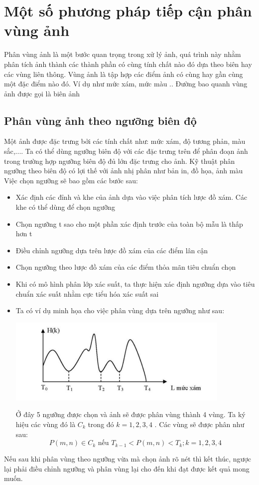 \documentclass[12pt,oneside,a4]{report}
\begin{document}
\chapter{Một số phương pháp tiếp cận phân vùng ảnh}
Phân vùng ảnh là một bước quan trọng trong xử lý ảnh, quá trình này nhằm phân tích ảnh thành các thành phần có cùng tính chất nào đó dựa theo biên hay các vùng liên thông. Vùng ảnh là tập hợp các điểm ảnh có cùng hay gần cùng một đặc điểm nào đó. Ví dụ như mức xám, mức màu .. Đường bao quanh vùng ảnh được gọi là biên ảnh
\section{Phân vùng ảnh theo ngưỡng biên độ}
Một ảnh được đặc trưng bởi các tính chất như: mức xám, độ tương phản, màu sắc,.... Ta có thể dùng ngưỡng biên độ với các đặc trưng trên để phân đoạn ảnh trong trường hợp ngưỡng biên độ đủ lớn đặc trưng cho ảnh. Kỹ thuật phân ngưỡng theo biên độ có lợi thế với ảnh nhị phân như bản in, đồ họa, ảnh màu
Việc chọn ngưỡng sẽ bao gồm các bước sau:
\begin{itemize}
\item Xác định các đỉnh và khe của ảnh dựa vào việc phân tích lược đồ xám. Các khe có thể dùng để chọn ngưỡng
\item Chọn ngưỡng t sao cho một phần xác định trước của toàn bộ mẫu là thấp hơn t
\item Điều chỉnh ngưỡng dựa trên lược đồ xám của các điểm lân cận
\item Chọn ngưỡng theo lược đồ xám của các điểm thỏa mãn tiêu chuẩn chọn
\item Khi có mô hình phân lớp xác suất, ta thực hiện xác định ngưỡng dựa vào tiêu chuẩn xác suất nhằm cực tiểu hóa xác suất sai
\item Ta có ví dụ minh họa cho việc phân vùng dựa trên ngưỡng như sau:
\begin{center}
\includegraphics[]{figure/nguongbiendo.png}
\end{center}
Ở đây 5 ngưỡng được chọn và ảnh sẽ được phân vùng thành 4 vùng. Ta ký hiệu các vùng đó là $C_k$ trong đó $k=1,2,3,4$   . Các vùng sẽ được phân như sau:
\begin{equation}
P(m,n) \in C_{k}\textrm{ nếu } T_{k-1}<P(m,n)<T_{k}; k=1,2,3,4
\end{equation} 
\end{itemize}
Nếu sau khi phân vùng theo ngưỡng vừa mà chọn ảnh rõ nét thì kết thúc, ngược lại phải điều chỉnh ngưỡng và phân vùng lại cho đến khi đạt được kết quả mong muốn.
\end{document}
